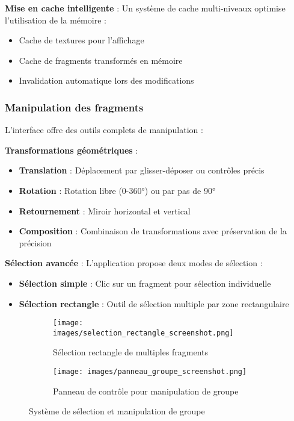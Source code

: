 \documentclass[12pt,a4paper]{report}
\begin{document}
\begin{}
\begin{}
\begin{}
\begin{}
\textbf{Mise en cache intelligente} : Un système de cache multi-niveaux optimise l'utilisation de la mémoire :
\begin{itemize}
\item Cache de textures pour l'affichage
\item Cache de fragments transformés en mémoire
\item Invalidation automatique lors des modifications
\end{itemize}

\subsubsection{Manipulation des fragments}

L'interface offre des outils complets de manipulation :

\textbf{Transformations géométriques} :
\begin{itemize}
\item \textbf{Translation} : Déplacement par glisser-déposer ou contrôles précis
\item \textbf{Rotation} : Rotation libre (0-360°) ou par pas de 90°
\item \textbf{Retournement} : Miroir horizontal et vertical
\item \textbf{Composition} : Combinaison de transformations avec préservation de la précision
\end{itemize}

\textbf{Sélection avancée} : L'application propose deux modes de sélection :
\begin{itemize}
\item \textbf{Sélection simple} : Clic sur un fragment pour sélection individuelle
\item \textbf{Sélection rectangle} : Outil de sélection multiple par zone rectangulaire
\end{itemize}

\begin{figure}[H]
\centering
\begin{subfigure}{0.48\textwidth}
\texttt{[image: images/selection\_rectangle\_screenshot.png]}
\caption{Sélection rectangle de multiples fragments}
\end{subfigure}
\hfill
\begin{subfigure}{0.48\textwidth}
\texttt{[image: images/panneau\_groupe\_screenshot.png]}
\caption{Panneau de contrôle pour manipulation de groupe}
\end{subfigure}
\caption{Système de sélection et manipulation de groupe}
\label{fig:selection_groupe}
\end{figure}


\end{}
\end{}
\end{}
\end{}
\end{document}
